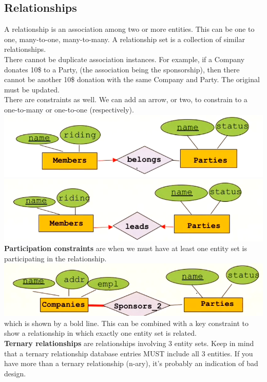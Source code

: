 \documentclass[12pt]{article}
\theoremstyle{definition}
\begin{document}
\subsection{Relationships}
A relationship is an association among two or more entities. This can be one to one, many-to-one, many-to-many. A relationship set is a collection of similar relationships.
\\ \linebreak
There cannot be duplicate association instances. For example, if a Company donates 10\$ to a Party, (the association being the sponsorship), then there cannot be another 10\$ donation with the same Company and Party. The original must be updated.
\\ \linebreak
There are constraints as well.
We can add an arrow, or two, to constrain to a one-to-many or one-to-one (respectively).  
\\ \includegraphics{one-to-many}
\\ \includegraphics{one-to-one}\\
\textbf{Participation constraints} are when we must have at least one entity set is participating in the relationship.
\\ \includegraphics{at-least-one}\\
which is shown by a bold line. This can be combined with a key constraint to show a relationship in which exactly one entity set is related. 
\\ \linebreak
\textbf{Ternary relationships} are relationships involving 3 entity sets. Keep in mind that a ternary relationship database entries MUST include all 3 entities. If you have more than a ternary relationship (n-ary), it's probably an indication of bad design.
\\ \linebreak
\end{document}

